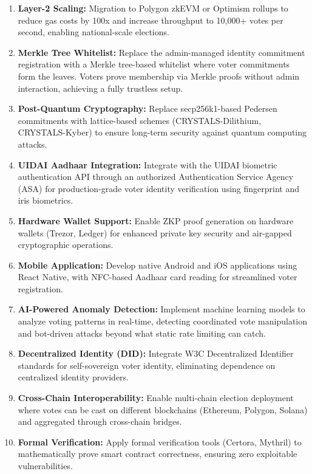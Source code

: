 \documentclass[oneside,a4paper,12pt]{book}
\begin{document}
\begin{enumerate}[leftmargin=1.5cm]
    \item \textbf{Layer-2 Scaling:} Migration to Polygon zkEVM or Optimism rollups to reduce gas costs by 100x and increase throughput to 10,000+ votes per second, enabling national-scale elections.

    \item \textbf{Merkle Tree Whitelist:} Replace the admin-managed identity commitment registration with a Merkle tree-based whitelist where voter commitments form the leaves. Voters prove membership via Merkle proofs without admin interaction, achieving a fully trustless setup.

    \item \textbf{Post-Quantum Cryptography:} Replace secp256k1-based Pedersen commitments with lattice-based schemes (CRYSTALS-Dilithium, CRYSTALS-Kyber) to ensure long-term security against quantum computing attacks.

    \item \textbf{UIDAI Aadhaar Integration:} Integrate with the UIDAI biometric authentication API through an authorized Authentication Service Agency (ASA) for production-grade voter identity verification using fingerprint and iris biometrics.

    \item \textbf{Hardware Wallet Support:} Enable ZKP proof generation on hardware wallets (Trezor, Ledger) for enhanced private key security and air-gapped cryptographic operations.

    \item \textbf{Mobile Application:} Develop native Android and iOS applications using React Native, with NFC-based Aadhaar card reading for streamlined voter registration.

    \item \textbf{AI-Powered Anomaly Detection:} Implement machine learning models to analyze voting patterns in real-time, detecting coordinated vote manipulation and bot-driven attacks beyond what static rate limiting can catch.

    \item \textbf{Decentralized Identity (DID):} Integrate W3C Decentralized Identifier standards for self-sovereign voter identity, eliminating dependence on centralized identity providers.

    \item \textbf{Cross-Chain Interoperability:} Enable multi-chain election deployment where votes can be cast on different blockchains (Ethereum, Polygon, Solana) and aggregated through cross-chain bridges.

    \item \textbf{Formal Verification:} Apply formal verification tools (Certora, Mythril) to mathematically prove smart contract correctness, ensuring zero exploitable vulnerabilities.
\end{enumerate}
\end{document}
